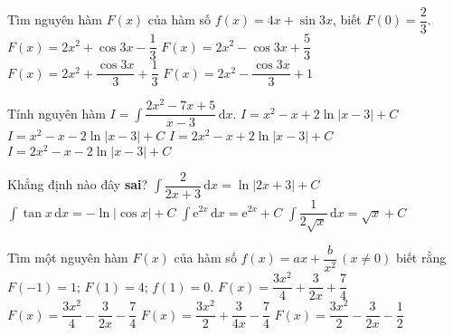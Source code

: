 \begin{ex}%
	Tìm nguyên hàm $F(x)$ của hàm số $f(x)=4x+\sin 3x$, biết $F(0)=\dfrac{2}{3}$. 
	\choice
	{$F(x)=2x^2+\cos 3x-\dfrac{1}{3}$}
	{$F(x)=2x^2-\cos 3x+\dfrac{5}{3}$}
	{$F(x)=2x^2+\dfrac{\cos 3x}{3}+\dfrac{1}{3}$}
	{\True $F(x)=2x^2-\dfrac{\cos 3x}{3}+1$}
\end{ex}
\begin{ex}%
	Tính nguyên hàm $I=\displaystyle\int\dfrac{2x^2-7x+5}{x-3}\mathrm{\,d}x$. 
	\choice
	{\True $I=x^2-x+2\ln |x-3|+C$}
	{$I=x^2-x-2\ln |x-3|+C$}
	{$I=2x^2-x+2\ln |x-3|+C$}
	{$I=2x^2-x-2\ln |x-3|+C$}
\end{ex}
\begin{ex}%
	Khẳng định nào đây \textbf{sai}? 
	\choice
	{$\displaystyle\int\dfrac{2}{2x+3}\mathrm{\,d}x=\ln |2x+3|+C$}
	{$\displaystyle\int\tan x\mathrm{\,d}x=-\ln |\cos x|+C$}
	{\True $\displaystyle\int\mathrm{e}^{2x}\mathrm{\,d}x=\mathrm{e}^{2x}+C$}
	{$\displaystyle\int\dfrac{1}{2\sqrt{x}}\mathrm{\,d}x=\sqrt{x}+C$}
\end{ex}
\begin{ex}%
	Tìm một nguyên hàm $F(x)$ của hàm số $f(x)=ax+\dfrac{b}{x^2} \, (x\neq 0)$ biết rằng $F(-1)=1$; $F(1)=4$; $f(1)=0$. 
	\choice
	{\True $F(x)=\dfrac{3x^2}{4}+\dfrac{3}{2x}+\dfrac{7}{4}$}
	{$F(x)=\dfrac{3x^2}{4}-\dfrac{3}{2x}-\dfrac{7}{4}$}
	{$F(x)=\dfrac{3x^2}{2}+\dfrac{3}{4x}-\dfrac{7}{4}$}
	{$F(x)=\dfrac{3x^2}{2}-\dfrac{3}{2x}-\dfrac{1}{2}$}
\end{ex}
